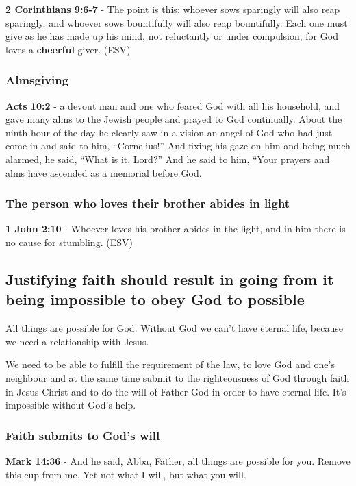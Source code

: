 \documentclass[11pt]{article}
\begin{document}
\textbf{2 Corinthians 9:6-7} - The point is this: whoever sows sparingly will also reap sparingly, and whoever sows bountifully will also reap bountifully.  Each one must give as he has made up his mind, not reluctantly or under compulsion, for God loves a \textbf{cheerful} giver.  (ESV)

\subsubsection{Almsgiving}
\label{sec:org4487eea}
\textbf{Acts 10:2} - a devout man and one who feared God with all his household, and gave many alms to the Jewish people and prayed to God continually.  About the ninth hour of the day he clearly saw in a vision an angel of God who had just come in and said to him, “Cornelius!” And fixing his gaze on him and being much alarmed, he said, “What is it, Lord?” And he said to him, “Your prayers and alms have ascended as a memorial before God.

\subsubsection{The person who loves their brother abides in light}
\label{sec:orgaa3fea0}
\textbf{1 John 2:10} - Whoever loves his brother abides in the light, and in him there is no cause for stumbling.  (ESV)

\subsection{Justifying faith should result in going from it being impossible to obey God to possible}
\label{sec:org96fab11}
All things are possible for God.
Without God we can't have eternal life, because we need a relationship with Jesus.

We need to be able to fulfill the requirement
of the law, to love God and one's neighbour and at the same time
submit to the righteousness of God through faith in Jesus
Christ and to do the will of Father God in
order to have eternal life. It's impossible without God's help.

\subsubsection{Faith submits to God's will}
\label{sec:org4cda805}
\textbf{Mark 14:36} - And he said, Abba, Father, all things are possible for you. Remove this cup from me. Yet not what I will, but what you will.
\end{document}

